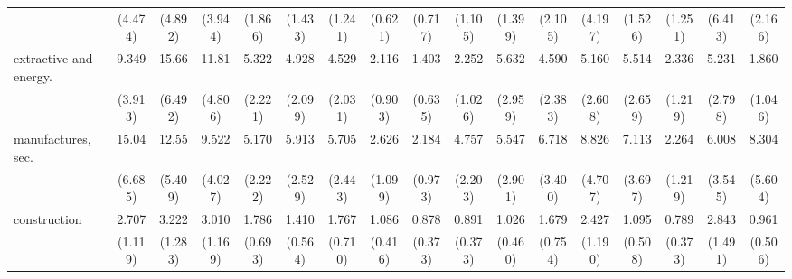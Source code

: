 {\begin{tabular}{l*{16}{c}}
                    &     (4.474)         &     (4.892)         &     (3.944)         &     (1.866)         &     (1.433)         &     (1.241)         &     (0.621)         &     (0.717)         &     (1.105)         &     (1.399)         &     (2.105)         &     (4.197)         &     (1.526)         &     (1.251)         &     (6.413)         &     (2.166)         \\
[1em]
extractive and energy.&       9.349\sym{***}&       15.66\sym{***}&       11.81\sym{***}&       5.322\sym{***}&       4.928\sym{***}&       4.529\sym{***}&       2.116         &       1.403         &       2.252         &       5.632\sym{**} &       4.590\sym{**} &       5.160\sym{**} &       5.514\sym{***}&       2.336         &       5.231\sym{**} &       1.860         \\
                    &     (3.913)         &     (6.492)         &     (4.806)         &     (2.221)         &     (2.099)         &     (2.031)         &     (0.903)         &     (0.635)         &     (1.026)         &     (2.959)         &     (2.383)         &     (2.608)         &     (2.659)         &     (1.219)         &     (2.798)         &     (1.046)         \\
[1em]
manufactures, sec.  &       15.04\sym{***}&       12.55\sym{***}&       9.522\sym{***}&       5.170\sym{***}&       5.913\sym{***}&       5.705\sym{***}&       2.626\sym{*}  &       2.184         &       4.757\sym{***}&       5.547\sym{**} &       6.718\sym{***}&       8.826\sym{***}&       7.113\sym{***}&       2.264         &       6.008\sym{**} &       8.304\sym{**} \\
                    &     (6.685)         &     (5.409)         &     (4.027)         &     (2.222)         &     (2.529)         &     (2.443)         &     (1.099)         &     (0.973)         &     (2.203)         &     (2.901)         &     (3.400)         &     (4.707)         &     (3.697)         &     (1.219)         &     (3.545)         &     (5.604)         \\
[1em]
construction        &       2.707\sym{*}  &       3.222\sym{**} &       3.010\sym{**} &       1.786         &       1.410         &       1.767         &       1.086         &       0.878         &       0.891         &       1.026         &       1.679         &       2.427         &       1.095         &       0.789         &       2.843\sym{*}  &       0.961         \\
                    &     (1.119)         &     (1.283)         &     (1.169)         &     (0.693)         &     (0.564)         &     (0.710)         &     (0.416)         &     (0.373)         &     (0.373)         &     (0.460)         &     (0.754)         &     (1.190)         &     (0.508)         &     (0.373)         &     (1.491)         &     (0.506)         \\

\end{tabular}}
